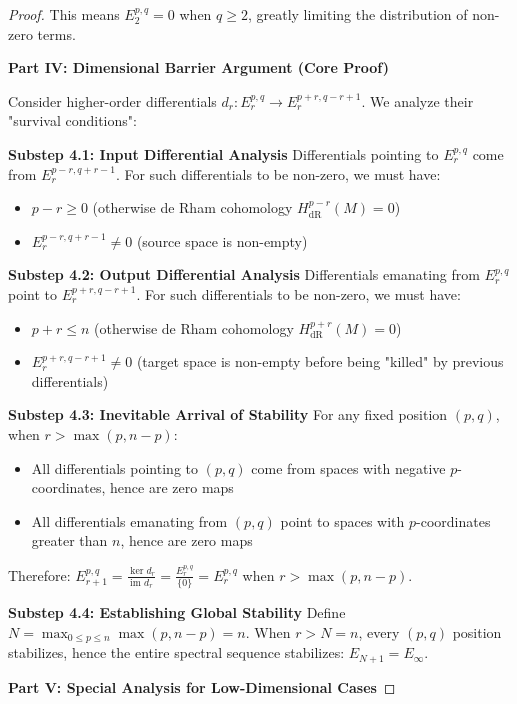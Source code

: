 \documentclass[a4paper,12pt]{extarticle}
\theoremstyle{definition}
\begin{document}
\begin{proof}
This means $E_2^{p,q} = 0$ when $q \geq 2$, greatly limiting the distribution of non-zero terms.

\textbf{Part IV: Dimensional Barrier Argument (Core Proof)}

Consider higher-order differentials $d_r: E_r^{p,q} \to E_r^{p+r, q-r+1}$. We analyze their "survival conditions":

\textbf{Substep 4.1: Input Differential Analysis}
Differentials pointing to $E_r^{p,q}$ come from $E_r^{p-r, q+r-1}$. For such differentials to be non-zero, we must have:
\begin{itemize}
\item $p-r \geq 0$ (otherwise de Rham cohomology $H^{p-r}_{\text{dR}}(M) = 0$)
\item $E_r^{p-r, q+r-1} \neq 0$ (source space is non-empty)
\end{itemize}

\textbf{Substep 4.2: Output Differential Analysis}  
Differentials emanating from $E_r^{p,q}$ point to $E_r^{p+r, q-r+1}$. For such differentials to be non-zero, we must have:
\begin{itemize}
\item $p+r \leq n$ (otherwise de Rham cohomology $H^{p+r}_{\text{dR}}(M) = 0$)
\item $E_r^{p+r, q-r+1} \neq 0$ (target space is non-empty before being "killed" by previous differentials)
\end{itemize}

\textbf{Substep 4.3: Inevitable Arrival of Stability}
For any fixed position $(p,q)$, when $r > \max(p, n-p)$:
\begin{itemize}
\item All differentials pointing to $(p,q)$ come from spaces with negative $p$-coordinates, hence are zero maps
\item All differentials emanating from $(p,q)$ point to spaces with $p$-coordinates greater than $n$, hence are zero maps
\end{itemize}

Therefore: $E_{r+1}^{p,q} = \frac{\ker d_r}{\text{im } d_r} = \frac{E_r^{p,q}}{\{0\}} = E_r^{p,q}$ when $r > \max(p, n-p)$.

\textbf{Substep 4.4: Establishing Global Stability}
Define $N = \max_{0 \leq p \leq n} \max(p, n-p) = n$. When $r > N = n$, every $(p,q)$ position stabilizes, hence the entire spectral sequence stabilizes: $E_{N+1} = E_\infty$.

\textbf{Part V: Special Analysis for Low-Dimensional Cases}


\end{proof}
\end{document}
